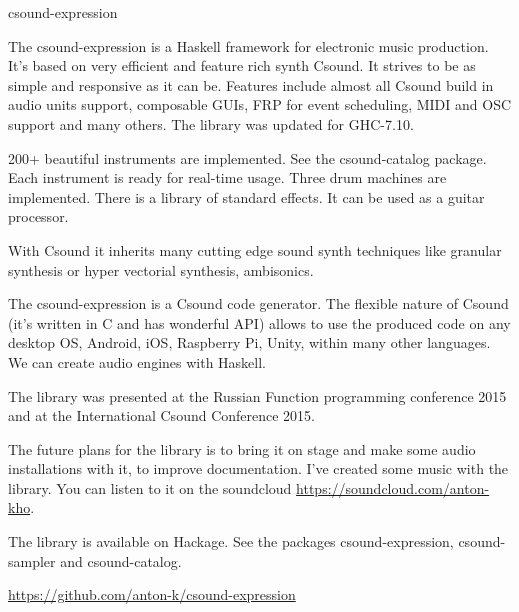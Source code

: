 \begin{hcarentry}[updated]{csound-expression}
\makeheader

The csound-expression is a Haskell framework for electronic music production.
It's based on very efficient and feature rich synth Csound.
It strives to be as simple and responsive as it can be.
Features include almost all Csound build in audio units support,
composable GUIs, FRP for event scheduling, MIDI and OSC support and many others.
The library was updated for GHC-7.10.

200+ beautiful instruments are implemented. See the csound-catalog package.
Each instrument is ready for real-time usage. Three drum machines are implemented.
There is a library of standard effects. It can be used as a guitar processor.

With Csound it inherits many cutting edge sound synth techniques like
granular synthesis or hyper vectorial synthesis, ambisonics.

The csound-expression is a Csound code generator. The flexible nature of Csound 
(it's written in C and has wonderful API)  allows to use the produced 
code on any desktop OS, Android, iOS, Raspberry Pi, Unity, within many other languages.
We can create audio engines with Haskell.

The library was presented at the Russian Function programming conference 2015
and at the International Csound Conference 2015. 

The future plans for the library is to bring it on stage and make 
some audio installations with it, to improve documentation.
I've created some music with the library. You can listen to it 
on the soundcloud \url{https://soundcloud.com/anton-kho}.

The library is available on Hackage.
See the packages csound-expression, csound-sampler and csound-catalog.

\FurtherReading
  \url{https://github.com/anton-k/csound-expression}
\end{hcarentry}
